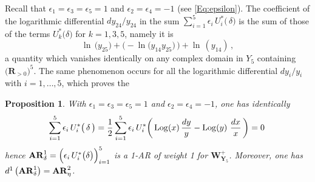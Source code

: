 \documentclass[11pt]{amsart}
\newtheorem{prop}[thm]{Proposition}
\begin{document}
Recall that  $\epsilon_1=\epsilon_3=\epsilon_5=1$ and 
 $\epsilon_2=\epsilon_4=-1$ (see \eqref{Eq:epsilon}).  The coefficient of the logarithmic differential ${\mathit{dy_{24}}}/{\mathit{y_{24}}}$ in 
the sum $\sum_{i=1}^5 \epsilon_i \, U_i^*\big(\,  
\delta \big)$ 
is the sum of those of the terms 
$ U_k^*\big( \delta\big) $ for $k=1,3, 5$, namely it is 
$$
\ln  \,({ \mathit{y_{25}} )} + \Big( - 
\ln  \big(  \mathit{y_{14}} \mathit{y_{25}} \big)\, 
\Big) +\ln \, ( \mathit{y_{14}} )\, , 
$$
a quantity which vanishes identically on any complex domain in $Y_5$ containing $(\mathbf R_{>0}\big)^5$. 
The same phenomenon occurs for all the logarithmic differential $dy_i/y_i$ with $i=1,\ldots,5$, which proves the 
\begin{prop}
\label{Prop:AR-Omega1}
 With  $\epsilon_1=\epsilon_3=\epsilon_5=1$ and 
 $\epsilon_2=\epsilon_4=-1$, 
  one has identically 
\begin{equation}
\label{Eq:AR-Omega1}
\sum_{i=1}^5 \epsilon_i \, U_i^*\big(\,  
\delta \, \big)
=\frac{1}{2}
\sum_{i=1}^5 \epsilon_i \,  U_i^*\bigg(\,  
{\rm Log}(x)\, \frac{dy}{y}-{\rm Log}(y)\,\, \frac{dx}{x}\, 
\bigg) =0\, 
\end{equation}
 hence %
 ${\bf AR}_\delta^1=\Big(  \epsilon_i \,U_i^*\big( \delta\big)\Big)_{i=1}^5$ is a 1-AR of weight 1 for $\boldsymbol{W}^{+}_{ \boldsymbol{Y}_5}$.  Moreover, one has 
 $d^1 \, \big({\bf AR}^1_\delta\big)= {\bf AR}^2_\eta$. 
\end{prop}
\end{document}
